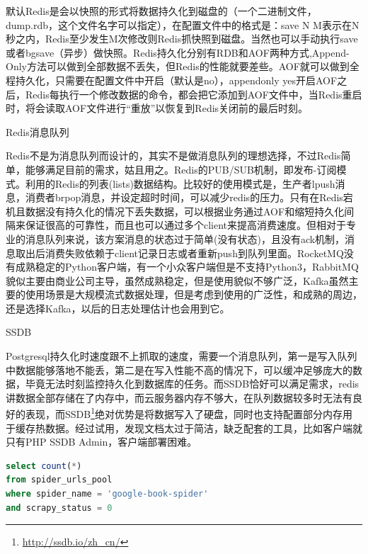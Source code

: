 \documentclass[8pt]{book}
\makeatletter
\numberwithin{dummy}{section}
\theoremstyle{ocrenumbox}
\theoremstyle{blacknumex}
\theoremstyle{blacknumbox}
\theoremstyle{ocrenum}
\renewcommand{\section}{\@startsection{section}{1}{\z@}
	{-4ex \@plus -1ex \@minus -.4ex}
	{1ex \@plus.2ex }
	{\normalfont\large\sffamily\bfseries}}
\renewcommand{\subsection}{\@startsection {subsection}{2}{\z@}
	{-3ex \@plus -0.1ex \@minus -.4ex}
	{0.5ex \@plus.2ex }
	{\normalfont\sffamily\bfseries}}
\makeatother
\begin{document}
默认Redis是会以快照的形式将数据持久化到磁盘的（一个二进制文件，dump.rdb，这个文件名字可以指定），在配置文件中的格式是：save N M表示在N秒之内，Redis至少发生M次修改则Redis抓快照到磁盘。当然也可以手动执行save或者bgsave（异步）做快照。Redis持久化分别有RDB和AOF两种方式,Append-Only方法可以做到全部数据不丢失，但Redis的性能就要差些。AOF就可以做到全程持久化，只需要在配置文件中开启（默认是no），appendonly yes开启AOF之后，Redis每执行一个修改数据的命令，都会把它添加到AOF文件中，当Redis重启时，将会读取AOF文件进行“重放”以恢复到Redis关闭前的最后时刻。

\subsection{Redis消息队列}

Redis不是为消息队列而设计的，其实不是做消息队列的理想选择，不过Redis简单，能够满足目前的需求，姑且用之。Redis的PUB/SUB机制，即发布-订阅模式。利用的Redis的列表(lists)数据结构。比较好的使用模式是，生产者lpush消息，消费者brpop消息，并设定超时时间，可以减少redis的压力。只有在Redis宕机且数据没有持久化的情况下丢失数据，可以根据业务通过AOF和缩短持久化间隔来保证很高的可靠性，而且也可以通过多个client来提高消费速度。但相对于专业的消息队列来说，该方案消息的状态过于简单(没有状态)，且没有ack机制，消息取出后消费失败依赖于client记录日志或者重新push到队列里面。RocketMQ没有成熟稳定的Python客户端，有一个小众客户端但是不支持Python3，RabbitMQ貌似主要由商业公司主导，虽然成熟稳定，但是使用貌似不够广泛，Kafka虽然主要的使用场景是大规模流式数据处理，但是考虑到使用的广泛性，和成熟的周边，还是选择Kafka，以后的日志处理估计也会用到它。

\section{SSDB}

Postgresql持久化时速度跟不上抓取的速度，需要一个消息队列，第一是写入队列中数据能够落地不能丢，第二是在写入性能不高的情况下，可以缓冲足够庞大的数据，毕竟无法时刻监控持久化到数据库的任务。而SSDB恰好可以满足需求，redis讲数据全部存储在了内存中，而云服务器内存不够大，在队列数据较多时无法有良好的表现，而SSDB\footnote{\url{http://ssdb.io/zh_cn/}}绝对优势是将数据写入了硬盘，同时也支持配置部分内存用于缓存热数据。经过试用，发现文档太过于简洁，缺乏配套的工具，比如客户端就只有PHP SSDB Admin，客户端部署困难。

\begin{lstlisting}[language=SQL]
select count(*) 
from spider_urls_pool
where spider_name = 'google-book-spider'
and scrapy_status = 0
\end{lstlisting}
\end{document}
